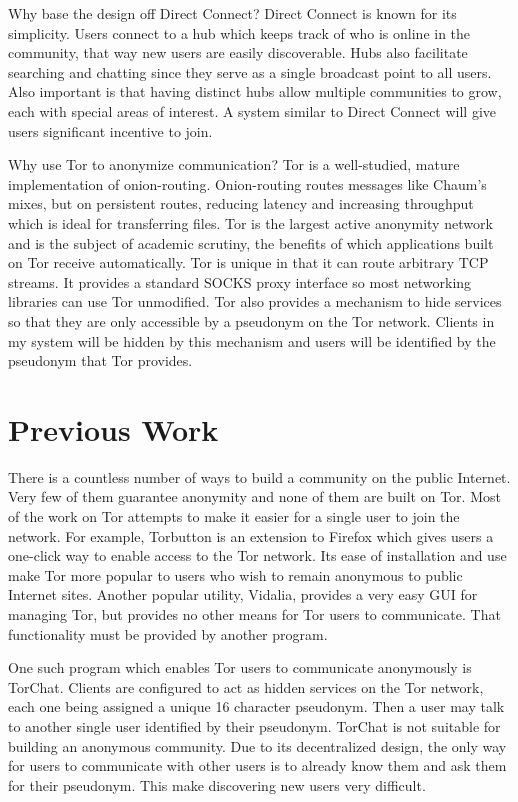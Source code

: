 \documentclass{article}
\begin{document}
Why base the design off Direct Connect?  Direct Connect is known for its simplicity.  Users connect to a hub which keeps track of who is online in the community, that way new users are easily discoverable.  Hubs also facilitate searching and chatting since they serve as a single broadcast point to all users.  Also important is that having distinct hubs allow multiple communities to grow, each with special areas of interest.  A system similar to Direct Connect will give users significant incentive to join.

Why use Tor to anonymize communication?  Tor is a well-studied, mature implementation of onion-routing.  Onion-routing routes messages like Chaum's mixes, but on persistent routes, reducing latency and increasing throughput which is ideal for transferring files.  Tor is the largest active anonymity network and is the subject of academic scrutiny, the benefits of which applications built on Tor receive automatically.  Tor is unique in that it can route arbitrary TCP streams.  It provides a standard SOCKS proxy interface so most networking libraries can use Tor unmodified.  Tor also provides a mechanism to hide services so that they are only accessible by a pseudonym on the Tor network.  Clients in my system will be hidden by this mechanism and users will be identified by the pseudonym that Tor provides.

\section{Previous Work}
There is a countless number of ways to build a community on the public Internet.  Very few of them guarantee anonymity and none of them are built on Tor.  Most of the work on Tor attempts to make it easier for a single user to join the network.  For example, Torbutton is an extension to Firefox which gives users a one-click way to enable access to the Tor network.  Its ease of installation and use make Tor more popular to users who wish to remain anonymous to public Internet sites.  Another popular utility, Vidalia, provides a very easy GUI for managing Tor, but provides no other means for Tor users to communicate.  That functionality must be provided by another program.

One such program which enables Tor users to communicate anonymously is TorChat.  Clients are configured to act as hidden services on the Tor network, each one being assigned a unique 16 character pseudonym.  Then a user may talk to another single user identified by their pseudonym.  TorChat is not suitable for building an anonymous community.  Due to its decentralized design, the only way for users to communicate with other users is to already know them and ask them for their pseudonym.  This make discovering new users very difficult.
\end{document}
